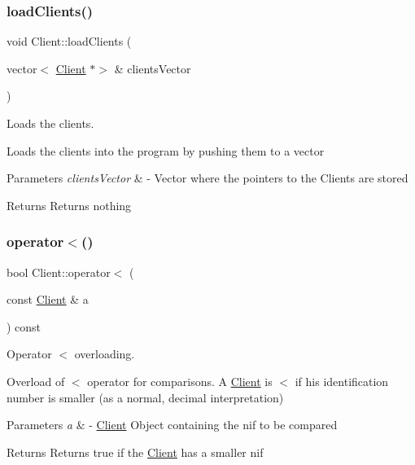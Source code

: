 \subsubsection{\texorpdfstring{load\+Clients()}{loadClients()}}
{\footnotesize\ttfamily void Client\+::load\+Clients (\begin{DoxyParamCaption}\item[{vector$<$ \hyperlink{class_client}{Client} $\ast$$>$ \&}]{clients\+Vector }\end{DoxyParamCaption})\hspace{0.3cm}{\ttfamily [static]}}



Loads the clients. 

Loads the clients into the program by pushing them to a vector


\begin{DoxyParams}{Parameters}
{\em clients\+Vector} & -\/ Vector where the pointers to the Clients are stored \\
\hline
\end{DoxyParams}
\begin{DoxyReturn}{Returns}
Returns nothing 
\end{DoxyReturn}
\mbox{\label{class_client_a1cbbbf2ea0d65791314b7640c053197b}} 
\subsubsection{\texorpdfstring{operator$<$()}{operator<()}}
{\footnotesize\ttfamily bool Client\+::operator$<$ (\begin{DoxyParamCaption}\item[{const \hyperlink{class_client}{Client} \&}]{a }\end{DoxyParamCaption}) const}



Operator $<$ overloading. 

Overload of $<$ operator for comparisons. A \hyperlink{class_client}{Client} is $<$ if his identification number is smaller (as a normal, decimal interpretation)


\begin{DoxyParams}{Parameters}
{\em a} & -\/ \hyperlink{class_client}{Client} Object containing the nif to be compared \\
\hline
\end{DoxyParams}
\begin{DoxyReturn}{Returns}
Returns true if the \hyperlink{class_client}{Client} has a smaller nif 
\end{DoxyReturn}
\mbox{\label{class_client_a5cc669077f776648216ae03461b8c178}} 
